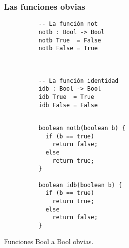 \documentclass{beamer}
\begin{document}
\begin{frame}[fragile]
  \frametitle{Las funciones obvias}

  \begin{listing}[H]
    \begin{center}
      \begin{minipage}{0.42\textwidth}
          \begin{verbatim}
          -- La función not
          notb : Bool -> Bool
          notb True  = False
          notb False = True



          -- La función identidad
          idb : Bool -> Bool
          idb True  = True
          idb False = False


          \end{verbatim}
      \end{minipage}
      \hspace{-0.05\textwidth}
      \vrule
      \hspace{0.025\textwidth}
      \begin{minipage}{0.45\textwidth}
          \begin{verbatim}
          boolean notb(boolean b) {
            if (b == true)
              return false;
            else
              return true;
          }

          boolean idb(boolean b) {
            if (b == true)
              return true;
            else
              return false;
          }
          \end{verbatim}
      \end{minipage}
    \end{center}
    \caption{Funciones Bool a Bool obvias.}
    \label{lst:btobIdrisJavaObvias}
  \end{listing}


\end{frame}
\end{document}
